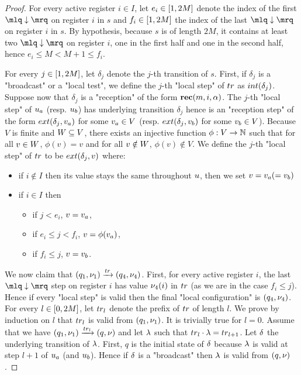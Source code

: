 \begin{proof}
	For every active register $i \in I$, let $e_i \in [1,2M]$ denote the index of the first $\quotemarks{\enregact}$ on register $i$ in $s$ and $f_i \in [1,2M]$ the index of the last $\quotemarks{\enregact}$ on register $i$ in $s$. By hypothesis, because $s$ is of length $2M$, it contains at least two $\quotemarks{\enregact}$ on register $i$, one in the first half and one in the second half, hence $e_i \leq M < M +1 \leq f_i$. 
	
	For every $j \in [1,2M]$, let $\delta_j$ denote the $j$-th transition of $s$. First, if  $\delta_j$ is a "broadcast" or a "local test", we define the $j$-th "local step" of $\atrace$ as $\intlabel{\delta_j}$. 
	Suppose now that $\delta_j$ is a "reception" of the form $\textbf{rec}(m, i, \alpha)$. The $j$-th "local step" of $u_a$ (resp. $u_b$) has underlying transition $\delta_j$ hence is an "reception step" of the form $\extlabel{\delta_j}{\aval_a}$ for some $v_a \in V$ (resp. $\extlabel{\delta_j}{\aval_b}$ for some $v_b \in V$).
	Because $V$ is finite and $W \subseteq V$, there exists an injective function $\phi: V \rightarrow \mathbb{N}$ such that for all $v \in W$, $\phi(v) = v$ and for all $v \notin W$, $\phi(v) \notin V$.
	We define the $j$-th "local step" of $\atrace$ to be $\extlabel{\delta_j}{\aval}$ where:
	\begin{itemize}
		\item if $i \notin I$ then its value stays the same throughout $u$, then we set $v = v_a (= v_b)$ 
		\item if $i \in I$ then  
		\begin{itemize}
			\item if $j < e_i$, $v = v_a$,
			\item if $e_i \leq j < f_i$, $v = \phi(v_a)$,
			\item if $f_i \leq j$, $v = v_b$.
		\end{itemize}
	\end{itemize}
	We now claim that $(q_1,\localdata_1) \step{\atrace} (q_4,\localdata_4)$. 
	First, for every active register $i$, the last $\quotemarks{\enregact}$ step on register $i$ has value $\nu_4(i)$ in $\atrace$ (as we are in the case $f_i \leq j$). Hence if every "local step" is valid then the final "local configuration" is $(q_4, \nu_4)$.
	For every $l \in [0,2M]$, let $\atrace_l$ denote the prefix of $\atrace$ of length $l$.
	We prove by induction on $l$ that $\atrace_l$ is valid from $(q_1, \nu_1)$. It is trivially true for $l =0$. Assume that we have $(q_1, \localdata_1) \step{\atrace_l} (q, \localdata)$ and let $\lambda$ such that $\atrace_l \cdot \locallabel = \atrace_{l+1}$. Let $\delta$ the underlying transition of $\lambda$.
	First, $q$ is the initial state of $\delta$ because $\lambda$ is valid at step $l+1$ of $u_a$ (and $u_b$). Hence if $\delta$ is a "broadcast" then $\lambda$ is valid from $(q,\nu)$.
	

\end{proof}
